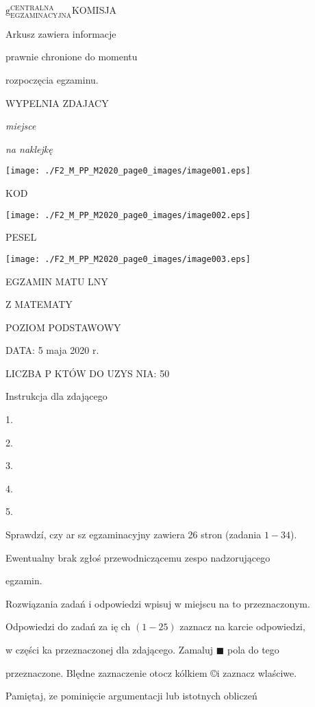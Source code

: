 \documentclass[a4paper,12pt]{article}
\begin{document}
$\mathrm{g}_{\mathrm{E}\mathrm{G}\mathrm{Z}\mathrm{A}\mathrm{M}\mathrm{I}\mathrm{N}\mathrm{A}\mathrm{C}\mathrm{Y}\mathrm{J}\mathrm{N}\mathrm{A}}^{\mathrm{C}\mathrm{E}\mathrm{N}\mathrm{T}\mathrm{R}\mathrm{A}\mathrm{L}\mathrm{N}\mathrm{A}}$KOMISJA

Arkusz zawiera informacje

prawnie chronione do momentu

rozpoczęcia egzaminu.

WYPELNIA ZDAJACY

{\it miejsce}

{\it na naklejkę}
\begin{center}
\texttt{[image: ./F2\_M\_PP\_M2020\_page0\_images/image001.eps]}
\end{center}
KOD
\begin{center}
\texttt{[image: ./F2\_M\_PP\_M2020\_page0\_images/image002.eps]}
\end{center}
PESEL
\begin{center}
\texttt{[image: ./F2\_M\_PP\_M2020\_page0\_images/image003.eps]}
\end{center}
EGZAMIN MATU  LNY

Z MATEMATY

POZIOM PODSTAWOWY

DATA: 5 maja 2020 $\mathrm{r}.$

LICZBA P KTÓW DO UZYS NIA: 50

Instrukcja dla zdającego

1.

2.

3.

4.

5.

Sprawdzí, czy ar sz egzaminacyjny zawiera 26 stron (zadania $1-34$).

Ewentualny brak zgłoś przewodniczącemu zespo nadzorującego

egzamin.

Rozwiązania zadań i odpowiedzi wpisuj w miejscu na to przeznaczonym.

Odpowiedzi do zadań za ię ch $(1-25)$ zaznacz na karcie odpowiedzi,

w części ka przeznaczonej dla zdającego. Zamaluj $\blacksquare$ pola do tego

przeznaczone. Blędne zaznaczenie otocz kólkiem \copyright i zaznacz wlaściwe.

Pamiętaj, $\dot{\mathrm{z}}\mathrm{e}$ pominięcie argumentacji lub istotnych obliczeń
\end{document}
